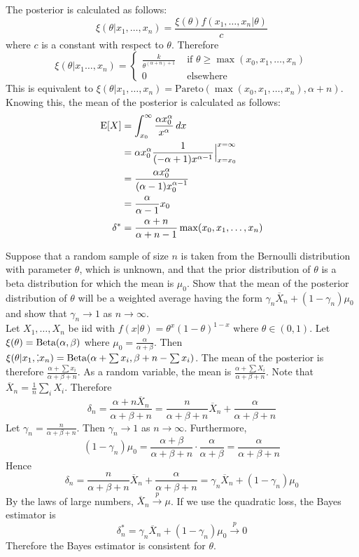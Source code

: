 \documentclass[12pt]{article}
\begin{document}
The posterior is calculated as follows: $$\xi(\theta|x_1,\dots,x_n) = \frac{\xi(\theta)f(x_1,\dots,x_n|\theta)}{c}$$ where $c$ is a constant with respect to $\theta$. 
Therefore $$ \xi(\theta|x_1\dots,x_n) = \begin{cases} \frac{k}{\theta^{(\alpha + n) + 1}} &\text{ if } \theta \geq \max(x_0,x_1,\dots,x_n) \\ 0 &\text{ elsewhere} \end{cases} $$ 
This is equivalent to $\xi(\theta|x_1,\dots,x_n) = \text{Pareto}(\max(x_0,x_1,\dots,x_n), \alpha + n)$. \\
Knowing this, the mean of the posterior is calculated as follows: $$ \begin{aligned} 
\mathrm{E}[ X ] &= \int_{x_0}^\infty \frac{\alpha x_0^\alpha}{x^\alpha} \, dx \\ &= \alpha x_0^\alpha \frac{1}{(-\alpha + 1)x^{\alpha -1}}\Big|_{x = x_0}^{x = \infty} \\ &= \frac{\alpha x_0^\alpha}{(\alpha - 1)x_0^{\alpha - 1}} \\ &= \frac{\alpha}{\alpha-1}x_0 \\ \delta^* &= \frac{\alpha + n}{\alpha + n -1} \max(x_0,x_1,\dots,x_n) \end{aligned} $$ 

Suppose that a random sample of size $n$ is taken from the Bernoulli distribution with parameter $\theta$, which is unknown, and that the prior distribution of $\theta$ is a beta distribution for which the mean is $\mu_0$. Show that the mean of the posterior distribution of $\theta$ will be a weighted average having the form $\gamma_n\overline{X}_n + (1 - \gamma_n)\mu_0$ and show that $\gamma_n \to 1$ as $n \to \infty$. \\
Let $X_1,\dots,X_n$ be iid with $f(x|\theta) = \theta^x(1-\theta)^{1-x}$ where $\theta \in (0,1)$. Let $\xi(\theta) = \text{Beta}( \alpha,\beta )$ where $\mu_0 = \frac{\alpha}{\alpha + \beta}$. Then $\xi(\theta|x_1,\dot,x_n) = \text{Beta}( \alpha + \sum x_i, \beta + n - \sum x_i )$. The mean of the posterior is therefore $\frac{\alpha + \sum x_i}{\alpha + \beta + n}$. As a random variable, the mean is $\frac{\alpha + \sum X_i}{\alpha + \beta + n}$. Note that $\overline{X}_n = \frac{1}{n} \sum_i X_i$.  Therefore $$\delta_n = \frac{\alpha + n\overline{X}_n}{\alpha + \beta + n} = \frac{n}{\alpha + \beta + n}\overline{X}_n + \frac{\alpha}{\alpha + \beta + n}$$ 
Let $\gamma_n = \frac{n}{\alpha + \beta + n}$. Then $\gamma_n \to 1$ as $n\to\infty$. Furthermore, $$(1 - \gamma_n)\mu_0 = \frac{\alpha + \beta}{\alpha + \beta + n} \cdot \frac{\alpha}{\alpha + \beta} = \frac{\alpha}{\alpha + \beta + n} $$ 
Hence $$ \delta_n = \frac{n}{\alpha + \beta + n}\overline{X}_n + \frac{\alpha}{\alpha + \beta + n} = \gamma_n\overline{X}_n + (1 - \gamma_n)\mu_0$$ 
By the laws of large numbers, $\overline{X}_n \stackrel{p}{\to} \mu$. If we use the quadratic loss, the Bayes estimator is $$ \delta_n^* = \gamma_n\overline{X}_n + (1-\gamma_n)\mu_0 \stackrel{p}{\to} 0 $$ Therefore the Bayes estimator is consistent for $\theta$. \\~\\
\end{document}
